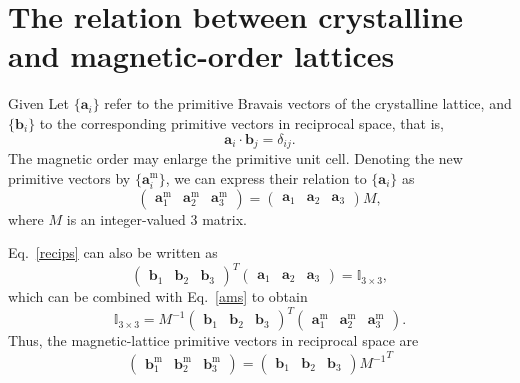 \documentclass[12pt, a4paper]{article}
\newcommand{\m}{\textrm{m}}
\begin{document}
\section{The relation between crystalline and magnetic-order lattices}
Given 
Let $\{\bm{a}_i\}$ refer to the primitive Bravais vectors of the crystalline lattice, and $\{\bm{b}_i\}$ to the corresponding primitive vectors in reciprocal space, that is,
\begin{equation}\label{recips}
  \bm{a}_i\cdot\bm{b}_j=\delta_{ij}.
\end{equation}
The magnetic order may enlarge the primitive unit cell. Denoting the new primitive vectors by $\{\bm{a}^\textrm{m}_i\}$, we can express their relation to $\{\bm{a}_i\}$ as
\begin{equation}\label{ams}
  \begin{pmatrix}
    \bm{a}^{\m}_1&
    \bm{a}^{\m}_2&
    \bm{a}^{\m}_3
  \end{pmatrix}=
  \begin{pmatrix}
    \bm{a}_1&
    \bm{a}_2&
    \bm{a}_3
  \end{pmatrix}M,
\end{equation}
where $M$ is an integer-valued 3 matrix.

Eq.~\ref{recips} can also be written as
\begin{equation}
  {\begin{pmatrix}
    \bm{b}_1&
    \bm{b}_2&
    \bm{b}_3
  \end{pmatrix}}^T
  \begin{pmatrix}
    \bm{a}_1&
    \bm{a}_2&
    \bm{a}_3
  \end{pmatrix}=\mathbb{I}_{3\times3},
\end{equation}
which can be combined with Eq.~\ref{ams} to obtain
\begin{equation}
  \mathbb{I}_{3\times3}  = M^{-1}
  {\begin{pmatrix}
    \bm{b}_1&
    \bm{b}_2&
    \bm{b}_3
  \end{pmatrix}}^T
  \begin{pmatrix}
    \bm{a}^{\m}_1&
    \bm{a}^{\m}_2&
    \bm{a}^{\m}_3
  \end{pmatrix}.
\end{equation}
Thus, the magnetic-lattice primitive vectors in reciprocal space are
\begin{equation}
  \begin{pmatrix}
    \bm{b}^{\m}_1&
    \bm{b}^{\m}_2&
    \bm{b}^{\m}_3
  \end{pmatrix}
  =\begin{pmatrix}
    \bm{b}_1&
    \bm{b}_2&
    \bm{b}_3
  \end{pmatrix}{M^{-1}}^T
\end{equation}
\end{document}
